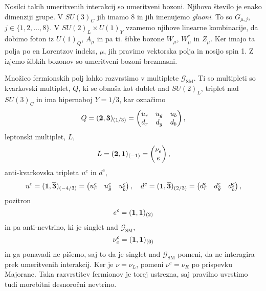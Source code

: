 Nosilci takih umeritvenih interakcij so umeritveni bozoni. Njihovo število je enako dimenziji grupe.
V $SU(3)_C$ jih imamo 8 in jih imenujemo \emph{gluoni}. To so $G_{\mu,j}$, $j \in \{1,2,\dots,8\}$.
V $SU(2)_L\times U(1)_Y$ vzamemo njihove linearne kombinacije, da dobimo foton iz $U(1)_Q$, $A_\mu$
in pa ti. šibke bozone $W_\mu$, $W^\dagger_\mu$ in $Z_\mu$. Ker imajo ta polja po en Lorentzov indeks,
$\mu$, jih pravimo vektorska polja in nosijo spin 1. Z izjemo šibkih bozonov so umeritveni bozoni
brezmasni.

Množico fermionskih polj lahko razvrstimo v multiplete $\mathcal{G}_\text{SM}$. Ti so multipleti so
kvarkovski multiplet, $Q$, ki se obnaša kot dublet nad $SU(2)_L$, triplet nad $SU(3)_C$ in ima
hipernaboj
$Y = 1/3$, kar označimo
\begin{equation}
	Q = (\mathbf{2}, \mathbf{3})_{(1/3)} = \begin{pmatrix}
		u_r & u_g & u_b \\
		d_r & d_g & d_b
	\end{pmatrix},
	\label{multipletiZ}
\end{equation}
leptonski multiplet, $L$,
\begin{equation}
	L = (\mathbf{2}, \mathbf{1})_{(-1)} = \begin{pmatrix}
		\nu_e \\ e
	\end{pmatrix},
\end{equation}
anti-kvarkovska tripleta $u^c$ in $d^c$,
\begin{equation}
	u^c = (\mathbf{1}, \overline{\mathbf{3}})_{(-4/3)} = \begin{pmatrix}
		u^c_{\bar{r}} & u^c_{\bar{g}} & u^c_{\bar{b}}
	\end{pmatrix}, \quad
	d^c = (\mathbf{1}, \overline{\mathbf{3}})_{(2/3)} = \begin{pmatrix}
		d^c_{\bar{r}} & d^c_{\bar{g}} & d^c_{\bar{b}}
	\end{pmatrix},
\end{equation}
pozitron
\begin{equation}
	e^c = (\mathbf{1}, \mathbf{1})_{(2)}
\end{equation}
in pa anti-nevtrino, ki je singlet nad $\mathcal{G}_\text{SM}$,
\begin{equation}
	\nu^c_e = (\mathbf{1}, \mathbf{1})_{(0)}
\end{equation}
in ga ponavadi ne pišemo, saj to da je singlet nad $\mathcal{G}_\text{SM}$ pomeni, da ne interagira
prek umeritvenih interakcij. Ker je $\nu = \nu_L$, pomeni $\nu^c = \nu_R$ po prispevku Majorane.
Taka razvrstitev fermionov je torej ustrezna, saj pravilno uvrstimo tudi morebitni desnoročni nevtrino.


